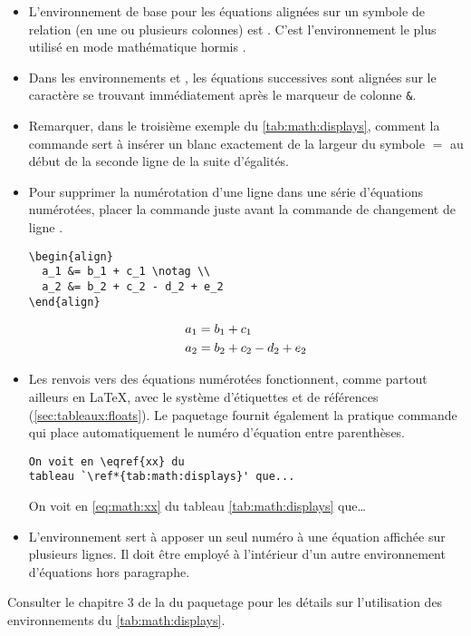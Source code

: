 \begin{itemize}
\item L'environnement de base pour les équations alignées sur un
  symbole de relation (en une ou plusieurs colonnes) est .
  C'est l'environnement le plus utilisé en mode mathématique hormis
  .
\item Dans les environnements  et , les équations
  successives sont alignées sur le caractère se trouvant immédiatement
  après le marqueur de colonne \verb=&=.
\item Remarquer, dans le troisième exemple du
  \autoref{tab:math:displays}, comment la commande \cmd{\phantom} sert
  à insérer un blanc exactement de la largeur du symbole $=$ au début
  de la seconde ligne de la suite d'égalités.
\item Pour supprimer la numérotation d'une ligne dans une série
  d'équations numérotées, placer la commande \cmd{\notag} juste avant
  la commande de changement de ligne {\bs\bs}.
  \begin{demo}
    \begin{texample}
\begin{lstlisting}
\begin{align}
  a_1 &= b_1 + c_1 \notag \\
  a_2 &= b_2 + c_2 - d_2 + e_2
\end{align}
\end{lstlisting}
      \producing
      \begin{align}
        a_1& =b_1+c_1 \notag \\
        a_2& =b_2+c_2-d_2+e_2
      \end{align}
    \end{texample}
  \end{demo}
\item Les renvois vers des équations numérotées fonctionnent, comme
  partout ailleurs en {\LaTeX}, avec le système d'étiquettes et de
  références (\autoref{sec:tableaux:floats}). Le paquetage
   fournit également la pratique commande \cmd{\eqref}
  qui place automatiquement le numéro d'équation entre parenthèses.
  \begin{demo}
    \begin{texample}
\begin{lstlisting}
On voit en \eqref{xx} du
tableau `\ref*{tab:math:displays}' que...
\end{lstlisting}
      \producing
      On voit en \eqref{eq:math:xx} du tableau
      \ref*{tab:math:displays} que\dots
    \end{texample}
  \end{demo}
\item L'environnement  sert à apposer un seul numéro à une
  équation affichée sur plusieurs lignes. Il doit être employé à
  l'intérieur d'un autre environnement d'équations hors paragraphe.
\end{itemize}
Consulter le chapitre 3 de la %
du paquetage  pour les détails sur
l'utilisation des environnements du \autoref*{tab:math:displays}.

